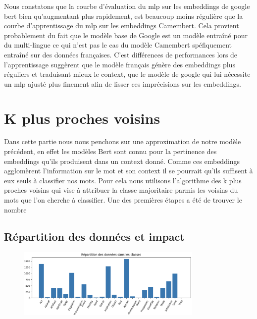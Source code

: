 \documentclass[12pt]{article}
\begin{document}
Nous constatons que la courbe d'évaluation  du mlp sur les embeddings de google bert bien qu'augmentant plus rapidement, est
beaucoup moins régulière que la courbe d'apprentissage du mlp sur les embeddings Camembert. Cela provient probablement du fait 
que le modèle base de Google est un modèle entraîné pour du multi-lingue ce qui n'est pas le cas du modèle Camembert spéfiquement 
entraîné sur des données françaises. C'est différences de performances lors de l'apprentissage suggèrent que le modèle français génère 
des embeddings plus réguliers et traduisant mieux le context, que le modèle de google qui lui nécessite un mlp ajusté plus finement afin 
de lisser ces imprécisions sur les embeddings.


\section{K plus proches voisins}

Dans cette partie nous nous penchons sur une approximation de notre modèle précédent, en effet les modèles Bert sont connu 
pour la pertinence des embeddings qu'ils produisent dans un context donné. Comme ces embeddings agglomèrent l'information sur 
le mot et son context il se pourrait qu'ils suffisent à eux seuls à classifier nos mots. Pour cela nous utilisons l'algorithme
des k plus proches voisins qui vise à attribuer la classe majoritaire parmis les voisins du mots que l'on cherche à classifier. Une des premières étapes a été de trouver le nombre 

\subsection{Répartition des données et impact}
\begin{figure}[H]
    \centering
    \includegraphics[width=0.8\textwidth]{static/data_rep.png}
\end{figure}
\end{document}
